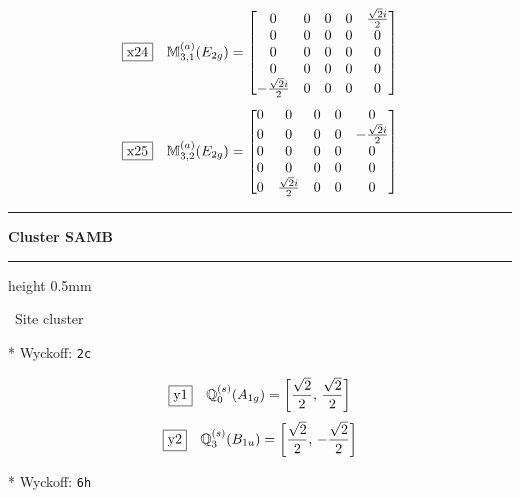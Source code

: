 \documentclass[fleqn,10pt,landscape]{jsarticle}
\begin{document}
\begin{dmath*}
\fbox{x24}\quad \mathbb{M}_{3,1}^{(a)}(E_{2g})=\begin{bmatrix} 0 & 0 & 0 & 0 & \frac{\sqrt{2} i}{2} \\ 0 & 0 & 0 & 0 & 0 \\ 0 & 0 & 0 & 0 & 0 \\ 0 & 0 & 0 & 0 & 0 \\ - \frac{\sqrt{2} i}{2} & 0 & 0 & 0 & 0 \end{bmatrix}
\end{dmath*}
\begin{dmath*}
\fbox{x25}\quad \mathbb{M}_{3,2}^{(a)}(E_{2g})=\begin{bmatrix} 0 & 0 & 0 & 0 & 0 \\ 0 & 0 & 0 & 0 & - \frac{\sqrt{2} i}{2} \\ 0 & 0 & 0 & 0 & 0 \\ 0 & 0 & 0 & 0 & 0 \\ 0 & \frac{\sqrt{2} i}{2} & 0 & 0 & 0 \end{bmatrix}
\end{dmath*}
\vspace{5mm}
\noindent \rule[0.5mm]{5mm}{0.5mm}\hspace{3mm}\textbf{Cluster SAMB}\hspace{3mm}\leaders\hrule height 0.5mm\hfill\kern0pt
\vspace{3mm}

\noindent\textbullet\, Site cluster

\vspace{5mm}

\noindent ** Wyckoff: \texttt{2c}

\begin{dmath*}
\fbox{y1}\quad \mathbb{Q}_{0}^{(s)}(A_{1g})=\left[ \frac{\sqrt{2}}{2},\, \frac{\sqrt{2}}{2} \right]
\end{dmath*}
\begin{dmath*}
\fbox{y2}\quad \mathbb{Q}_{3}^{(s)}(B_{1u})=\left[ \frac{\sqrt{2}}{2},\, - \frac{\sqrt{2}}{2} \right]
\end{dmath*}
\vspace{5mm}

\noindent ** Wyckoff: \texttt{6h}
\end{document}
